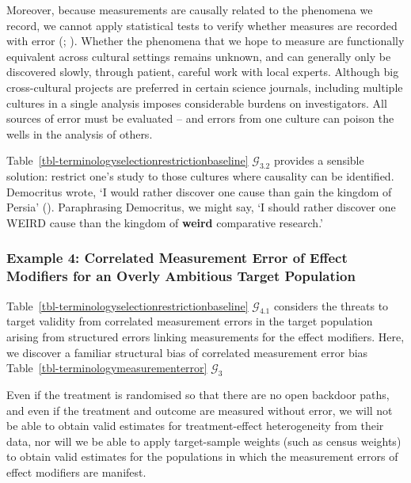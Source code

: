 \documentclass[
  single column]{article}
\begin{document}
Moreover, because measurements are causally related to the phenomena we
record, we cannot apply statistical tests to verify whether measures are
recorded with error (;
). Whether
the phenomena that we hope to measure are functionally equivalent across
cultural settings remains unknown, and can generally only be discovered
slowly, through patient, careful work with local experts. Although big
cross-cultural projects are preferred in certain science journals,
including multiple cultures in a single analysis imposes considerable
burdens on investigators. All sources of error must be evaluated -- and
errors from one culture can poison the wells in the analysis of others.

Table~\ref{tbl-terminologyselectionrestrictionbaseline}
\(\mathcal{G}_{3.2}\) provides a sensible solution: restrict one's study
to those cultures where causality can be identified. Democritus wrote,
`I would rather discover one cause than gain the kingdom of Persia'
(). Paraphrasing
Democritus, we might say, `I should rather discover one WEIRD cause than
the kingdom of \textbf{weird} comparative research.'

\subsubsection{Example 4: Correlated Measurement Error of Effect
Modifiers for an Overly Ambitious Target
Population}\label{example-4-correlated-measurement-error-of-effect-modifiers-for-an-overly-ambitious-target-population}

Table~\ref{tbl-terminologyselectionrestrictionbaseline}
\(\mathcal{G}_{4.1}\) considers the threats to target validity from
correlated measurement errors in the target population arising from
structured errors linking measurements for the effect modifiers. Here,
we discover a familiar structural bias of correlated measurement error
bias Table~\ref{tbl-terminologymeasurementerror} \(\mathcal{G}_3\)

Even if the treatment is randomised so that there are no open backdoor
paths, and even if the treatment and outcome are measured without error,
we will not be able to obtain valid estimates for treatment-effect
heterogeneity from their data, nor will we be able to apply
target-sample weights (such as census weights) to obtain valid estimates
for the populations in which the measurement errors of effect modifiers
are manifest.
\end{document}
